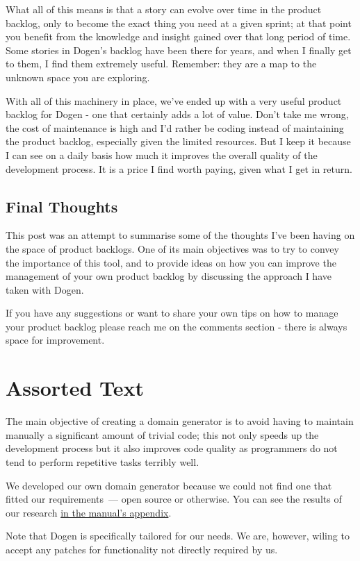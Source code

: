 \documentclass{book}
\begin{document}
What all of this means is that a story can evolve over time in the
product backlog, only to become the exact thing you need at a given
sprint; at that point you benefit from the knowledge and insight
gained over that long period of time. Some stories in Dogen's backlog
have been there for years, and when I finally get to them, I find them
extremely useful. Remember: they are a map to the unknown space you
are exploring.

With all of this machinery in place, we've ended up with a very useful
product backlog for Dogen - one that certainly adds a lot of
value. Don't take me wrong, the cost of maintenance is high and I'd
rather be coding instead of maintaining the product backlog,
especially given the limited resources. But I keep it because I can
see on a daily basis how much it improves the overall quality of the
development process. It is a price I find worth paying, given what I
get in return.

\section*{Final Thoughts}
\label{sec-6}

This post was an attempt to summarise some of the thoughts I've been
having on the space of product backlogs. One of its main objectives
was to try to convey the importance of this tool, and to provide ideas
on how you can improve the management of your own product backlog by
discussing the approach I have taken with Dogen.

If you have any suggestions or want to share your own tips on how to
manage your product backlog please reach me on the comments section -
there is always space for improvement.

\chapter{Assorted Text}

The main objective of creating a domain generator is to avoid having
to maintain manually a significant amount of trivial code; this not
only speeds up the development process but it also improves code
quality as programmers do not tend to perform repetitive tasks
terribly well.

We developed our own domain generator because we could not find one
that fitted our requirements~--- open source or otherwise. You can see
the results of our research
\href{https://github.com/kitanda/dogen/blob/master/doc/manual/manual.org#appendix-a---related-work}{in
  the manual's appendix}.

Note that Dogen is specifically tailored for our needs. We are,
however, wiling to accept any patches for functionality not directly
required by us.

\backmatter


\end{document}
